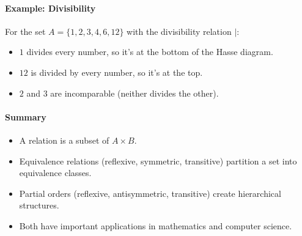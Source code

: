 \paragraph*{Example: Divisibility}
For the set $A = \{1, 2, 3, 4, 6, 12\}$ with the divisibility relation $|$:
\begin{itemize}
    \item $1$ divides every number, so it's at the bottom of the Hasse diagram.
    \item $12$ is divided by every number, so it's at the top.
    \item $2$ and $3$ are incomparable (neither divides the other).
\end{itemize}

\paragraph*{Summary}
\begin{itemize}
    \item A relation is a subset of $A \times B$.
    \item Equivalence relations (reflexive, symmetric, transitive) partition a set into equivalence classes.
    \item Partial orders (reflexive, antisymmetric, transitive) create hierarchical structures.
    \item Both have important applications in mathematics and computer science.
\end{itemize}